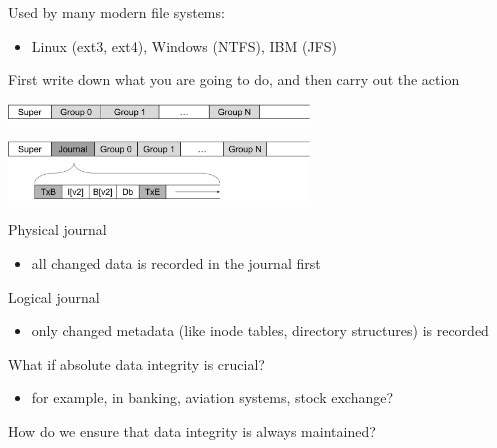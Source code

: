 \begin{slide}


    Used by many modern file systems: 
    \begin{itemize}
        \item Linux (ext3, ext4), Windows (NTFS), IBM (JFS)
    \end{itemize}
    \bigskip

    First write down what you are going to do, and then carry out the action
    \bigskip

    \includegraphics[width=80mm]{journaling-1.png}
    \medskip

    \includegraphics[width=80mm]{journaling-2.png}

\end{slide}

\begin{slide}


    Physical journal
    \begin{itemize}
        \item all changed data is recorded in the journal first
    \end{itemize}
    \bigskip

    Logical journal
    \begin{itemize}
        \item only changed metadata (like inode tables, directory structures) is recorded
    \end{itemize}

\end{slide}

\begin{slide}


    What if absolute data integrity is crucial?
    \begin{itemize}
        \item for example, in banking, aviation systems, stock exchange?
    \end{itemize}
    \bigskip
    
    How do we ensure that data integrity is always maintained?

\end{slide}

